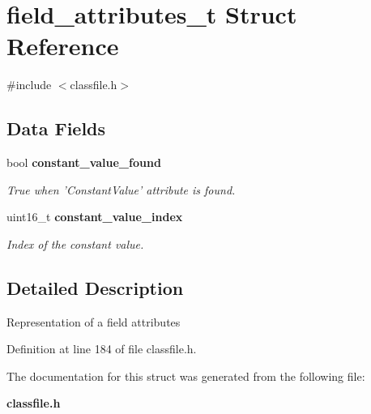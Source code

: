 \section{field\_\-attributes\_\-t Struct Reference}
\label{structfield__attributes__t}


{\ttfamily \#include $<$classfile.h$>$}

\subsection*{Data Fields}
\begin{DoxyCompactItemize}
\item 
bool {\bf constant\_\-value\_\-found}\label{structfield__attributes__t_ae0597149adf8f57c15b8c5b46cf9a7f6}

\begin{DoxyCompactList}\small\item\em True when 'ConstantValue' attribute is found. \item\end{DoxyCompactList}\item 
uint16\_\-t {\bf constant\_\-value\_\-index}\label{structfield__attributes__t_a8dc5204ab2172a5e7522a8eae18aa048}

\begin{DoxyCompactList}\small\item\em Index of the constant value. \item\end{DoxyCompactList}\end{DoxyCompactItemize}


\subsection{Detailed Description}
Representation of a field attributes 

Definition at line 184 of file classfile.h.



The documentation for this struct was generated from the following file:\begin{DoxyCompactItemize}
\item 
{\bf classfile.h}\end{DoxyCompactItemize}
